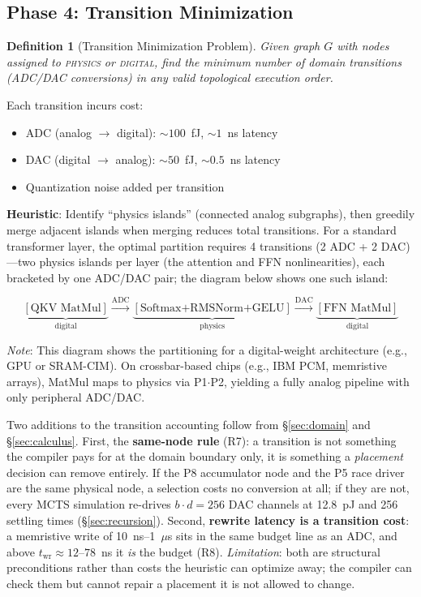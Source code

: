 \documentclass[11pt]{article}
\newtheorem{definition}{Definition}
\begin{document}
\subsection{Phase 4: Transition Minimization}
\label{sec:transitions}

\begin{definition}[Transition Minimization Problem]
Given graph $G$ with nodes assigned to \textsc{physics} or \textsc{digital}, find the minimum number of domain transitions (ADC/DAC conversions) in any valid topological execution order.
\end{definition}

Each transition incurs cost:
\begin{itemize}[leftmargin=*]
\item ADC (analog $\to$ digital): ${\sim}100$~fJ, ${\sim}1$~ns latency
\item DAC (digital $\to$ analog): ${\sim}50$~fJ, ${\sim}0.5$~ns latency
\item Quantization noise added per transition
\end{itemize}

\textbf{Heuristic}: Identify ``physics islands'' (connected analog subgraphs), then greedily merge adjacent islands when merging reduces total transitions. For a standard transformer layer, the optimal partition requires 4 transitions (2 ADC + 2 DAC)---two physics islands per layer (the attention and FFN nonlinearities), each bracketed by one ADC/DAC pair; the diagram below shows one such island:

\begin{equation*}
\underbrace{[\text{QKV MatMul}]}_{\text{digital}} \!\xrightarrow{\text{ADC}}\! \underbrace{[\text{Softmax+RMSNorm+GELU}]}_{\text{physics}} \!\xrightarrow{\text{DAC}}\! \underbrace{[\text{FFN MatMul}]}_{\text{digital}}
\end{equation*}

\noindent\textit{Note}: This diagram shows the partitioning for a digital-weight architecture (e.g., GPU or SRAM-CIM). On crossbar-based chips (e.g., IBM PCM, memristive arrays), MatMul maps to physics via P1$\cdot$P2, yielding a fully analog pipeline with only peripheral ADC/DAC.

Two additions to the transition accounting follow from \S\ref{sec:domain} and \S\ref{sec:calculus}. First, the \textbf{same-node rule} (R7): a transition is not something the compiler pays for at the domain boundary only, it is something a \textit{placement} decision can remove entirely. If the P8 accumulator node and the P5 race driver are the same physical node, a selection costs no conversion at all; if they are not, every MCTS simulation re-drives $b\cdot d = 256$ DAC channels at 12.8~pJ and 256 settling times (\S\ref{sec:recursion}). Second, \textbf{rewrite latency is a transition cost}: a memristive write of 10~ns--1~$\mu$s sits in the same budget line as an ADC, and above $t_{\mathrm{wr}} \approx 12$--$78$~ns it \textit{is} the budget (R8). \textit{Limitation}: both are structural preconditions rather than costs the heuristic can optimize away; the compiler can check them but cannot repair a placement it is not allowed to change.
\end{document}
